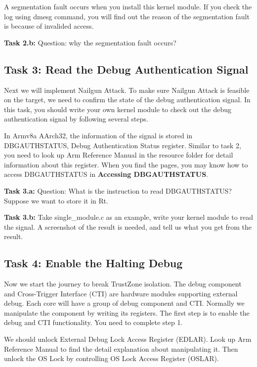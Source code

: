 A segmentation fault occurs when you install this kernel module. If you check the log using dmesg command, you will find out the reason of the segmentation fault is because of invalided access. 

\textbf{Task 2.b:} Question: why the segmentation fault occurs?

\subsection{Task 3: Read the Debug Authentication Signal}

Next we will implement Nailgun Attack. To make sure Nailgun Attack is feasible on the target, we need to confirm the state of the debug authentication signal. In this task, you should write your own kernel module to check out the debug authentication signal by following several steps.

In Armv8a AArch32, the information of the signal is stored in DBGAUTHSTATUS, Debug Authentication Status register. Similar to task 2, you need to look up Arm Reference Manual in the resource folder for detail information about this register. When you find the pages, you may know how to access DBGAUTHSTATUS in \textbf{Accessing DBGAUTHSTATUS}.

\textbf{Task 3.a:} Question: What is the instruction to read DBGAUTHSTATUS? Suppose we want to store it in Rt.

\textbf{Task 3.b:} Take single\_module.c as an example, write your kernel module to read the signal. A screenshot of the result is needed, and tell us what you get from the result.

\subsection{Task 4: Enable the Halting Debug}

Now we start the journey to break TrustZone isolation. The debug component and Cross-Trigger Interface (CTI) are hardware modules supporting external debug. Each core will have a group of debug component and CTI. Normally we manipulate the component by writing its registers. The first step is to enable the debug and CTI functionality. You need to complete step 1.

We should unlock External Debug Lock Access Register (EDLAR). Look up Arm Reference Manual to find the detail explanation about manipulating it. Then unlock the OS Lock by controlling OS Lock Access Register (OSLAR).

